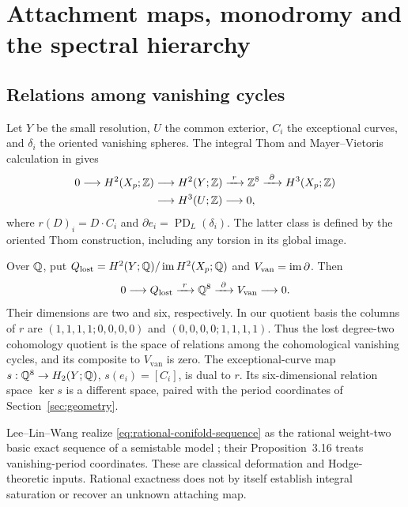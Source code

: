 \section{Attachment maps, monodromy and the spectral hierarchy}
\label{sec:topology-comparison}

\subsection{Relations among vanishing cycles}

Let $Y$ be the small resolution, $U$ the common exterior,
$C_i$ the exceptional curves, and $\delta_i$ the oriented
vanishing spheres. The integral Thom and Mayer--Vietoris
calculation in \cite[Section~3.3, proposition on restriction
and spectral coefficient]{wuebben-hodge} gives
\begin{equation}\label{eq:integral-conifold-sequence}
 \begin{aligned}
 0\longrightarrow H^2(X_p;\mathbb Z)
 &\longrightarrow H^2(Y;\mathbb Z)
 \xrightarrow{\ r\ }\mathbb Z^8
 \xrightarrow{\ \partial\ }H^3(X_p;\mathbb Z)\\
 &\longrightarrow H^3(U;\mathbb Z)\longrightarrow0,
 \end{aligned}
\end{equation}
where $r(D)_i=D\cdot C_i$ and
$\partial e_i=\operatorname{PD}_L(\delta_i)$.
The latter class is defined by the oriented Thom
construction, including any torsion in its global image.

Over $\mathbb Q$, put
$Q_{\mathrm{lost}}=H^2(Y;\mathbb Q)/\operatorname{im} H^2(X_p;\mathbb Q)$
and $V_{\mathrm{van}}=\operatorname{im}\partial$. Then
\begin{equation}\label{eq:rational-conifold-sequence}
 0\longrightarrow Q_{\mathrm{lost}}
 \xrightarrow{\ r\ }\mathbb Q^8
 \xrightarrow{\ \partial\ }V_{\mathrm{van}}
 \longrightarrow0.
\end{equation}
Their dimensions are two and six, respectively.
In our quotient basis the columns of $r$ are
$(1,1,1,1;0,0,0,0)$ and $(0,0,0,0;1,1,1,1)$.
Thus the lost degree-two cohomology quotient is the space of
relations among the cohomological vanishing cycles,
and its composite to $V_{\mathrm{van}}$ is zero.
The exceptional-curve map $s:\mathbb Q^8\to H_2(Y;\mathbb Q)$,
$s(e_i)=[C_i]$, is dual to $r$.
Its six-dimensional relation space $\ker s$ is
a different space, paired with the period
coordinates of Section~\ref{sec:geometry}.

Lee--Lin--Wang realize
\eqref{eq:rational-conifold-sequence} as the
rational weight-two basic exact sequence of a
semistable model \cite[Theorem~1.14]{lee-lin-wang};
their Proposition~3.16 treats vanishing-period
coordinates. These are classical deformation
and Hodge-theoretic inputs. Rational exactness
does not by itself establish integral saturation
or recover an unknown attaching map.

